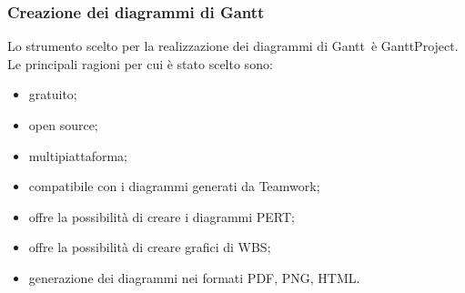 \documentclass[../NormeProgetto.tex]{subfiles}
\begin{document}
			\subsubsection{Creazione dei diagrammi di Gantt}
			Lo strumento scelto per la realizzazione dei diagrammi di Gantt\g\ è GanttProject. Le principali ragioni per cui è stato scelto sono:
			\begin{itemize}
				\item gratuito;
				\item open source\g;
				\item multipiattaforma;
				\item compatibile con i diagrammi generati da Teamwork\g;
				\item offre la possibilità di creare i diagrammi PERT\g;
				\item offre la possibilità di creare grafici di WBS\g;
				\item generazione dei diagrammi nei formati PDF\g, PNG\g, HTML.
			\end{itemize}
\end{document}
